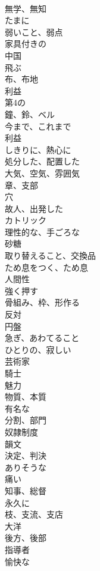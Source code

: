 \documentclass[8pt]{extreport}
\begin{document}
\begin{CJK}{UTF8}{min}
\\	無学、無知	
\\	たまに	
\\	弱いこと、弱点	
\\	家具付きの	
\\	中国	
\\	飛ぶ	
\\	布、布地	
\\	利益	
\\	第4の	
\\	鐘、鈴、ベル	
\\	今まで、これまで	
\\	利益	
\\	しきりに、熱心に	
\\	処分した、配置した	
\\	大気、空気、雰囲気	
\\	章、支部	
\\	穴	
\\	故人、出発した	
\\	カトリック	
\\	理性的な、手ごろな	
\\	砂糖	
\\	取り替えること、交換品	
\\	ため息をつく、ため息	
\\	人間性	
\\	強く押す	
\\	骨組み、枠、形作る	
\\	反対	
\\	円盤	
\\	急ぎ、あわてること	
\\	ひとりの、寂しい	
\\	芸術家	
\\	騎士	
\\	魅力	
\\	物質、本質	
\\	有名な	
\\	分割、部門	
\\	奴隷制度	
\\	韻文	
\\	決定、判決	
\\	ありそうな	
\\	痛い	
\\	知事、総督	
\\	永久に	
\\	枝、支流、支店	
\\	大洋	
\\	後方、後部	
\\	指導者	
\\	愉快な	

\end{CJK}
\end{document}
